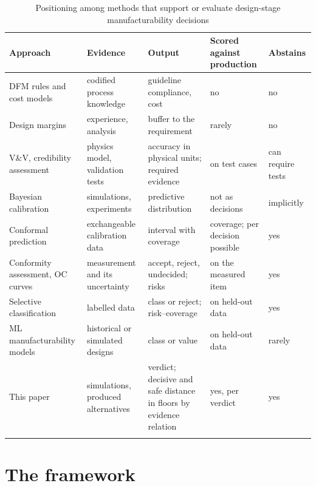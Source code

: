 \documentclass[pdflatex,sn-basic,lineno]{sn-jnl}
\newcommand{\tabsize}{\fontsize{8}{9.5}\selectfont}
\begin{document}
\begin{table}[t]
\tabsize
\setlength{\tabcolsep}{3.5pt}
\caption{Positioning among methods that support or evaluate design-stage manufacturability decisions}\label{tab:positioning}
\begin{tabular}{@{}L{3.0cm}L{2.5cm}L{3.0cm}L{1.9cm}L{1.6cm}@{}}
\toprule
Approach & Evidence & Output & Scored against production & Abstains \\
\midrule
DFM rules and cost models \citep{boothroyd2010product} & codified process knowledge & guideline compliance, cost & no & no \\
Design margins \citep{eckert2019design} & experience, analysis & buffer to the requirement & rarely & no \\
V\&V, credibility assessment \citep{oberkampf2010verification, asme2018assessing} & physics model, validation tests & accuracy in physical units; required evidence & on test cases & can require tests \\
Bayesian calibration \citep{kennedy2001bayesian} & simulations, experiments & predictive distribution & not as decisions & implicitly \\
Conformal prediction \citep{lei2018distribution} & exchangeable calibration data & interval with coverage & coverage; per decision possible & yes \\
Conformity assessment, OC curves \citep{iso2017decision, bechhofer1954single} & measurement and its uncertainty & accept, reject, undecided; risks & on the measured item & yes \\
Selective classification \citep{chow1970optimum, geifman2017selective} & labelled data & class or reject; risk--coverage & on held-out data & yes \\
ML manufacturability models \citep{ghadai2018learning, yan2026machine} & historical or simulated designs & class or value & on held-out data & rarely \\
This paper & simulations, produced alternatives & verdict; decisive and safe distance in floors by evidence relation & yes, per verdict & yes \\
\botrule
\end{tabular}
\end{table}

\section{The framework}\label{sec:method}
\end{document}

